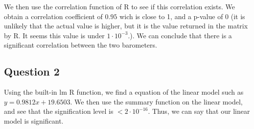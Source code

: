 \documentclass[12pt,a4paper]{article}
\begin{document}
We then use the correlation function of R to see if this correlation exists. We obtain a correlation coefficient of $0.95$ wich is close to 1, and a p-value of 0 (it is unlikely that the actual value is higher, but it is the value returned in the matrix by R. It seems this value is under $1\cdot 10^{-3}$.). We can conclude that there is a significant correlation between the two barometers.

\subsection*{Question 2}
Using the built-in lm R function, we find a equation of the linear model such as $y = 0.9812x + 19.6503$. We then use the summary function on the linear model, and see that the signification level is $<2 \cdot 10^{-16}$. Thus, we can say that our linear model is significant.
\end{document}
